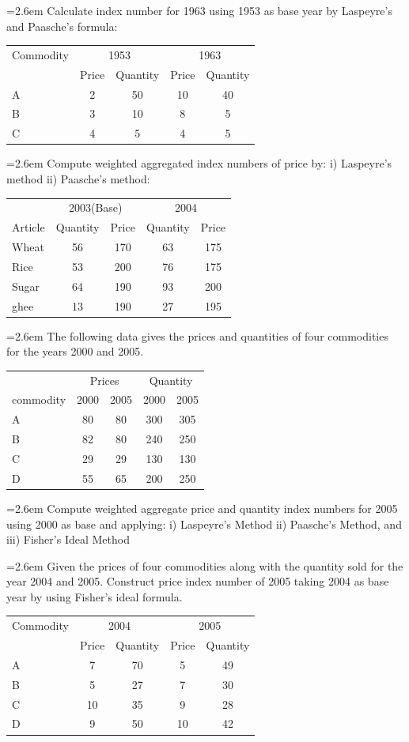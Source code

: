 \documentclass[11pt,a4paper]{article}
\newcommand{\Q}[2]{\par\smallskip\noindent\hangindent=2.6em\hangafter=1
  \makebox[2.6em][l]{\textbf{#1.}}#2\par}
\newcommand{\cont}[1]{\par\noindent\hangindent=2.6em\hangafter=-100 #1}
\newcommand{\dtab}[2]{\par\smallskip\noindent\hspace*{2.6em}\begin{tabular}{#1}\hline #2\\ \hline\end{tabular}\par\smallskip}
\begin{document}
\Q{104}{Calculate index number for 1963 using 1953 as base year by Laspeyre's and Paasche's formula:\dtab{|l@{\hspace{2em}}c@{\hspace{2em}}c@{\hspace{2em}}c@{\hspace{2em}}c|}{Commodity & \multicolumn{2}{c}{1953} & \multicolumn{2}{c}{1963} \\  & Price & Quantity & Price & Quantity \\ A & 2 & 50 & 10 & 40 \\ B & 3 & 10 & 8 & 5 \\ C & 4 & 5 & 4 & 5}}
\Q{105}{Compute weighted aggregated index numbers of price by: i) Laspeyre's method ii) Paasche's method:\dtab{|l@{\hspace{2em}}c@{\hspace{2em}}c@{\hspace{2em}}c@{\hspace{2em}}c|}{ & \multicolumn{2}{c}{2003(Base)} & \multicolumn{2}{c}{2004} \\ Article & Quantity & Price & Quantity & Price \\ Wheat & 56 & 170 & 63 & 175 \\ Rice & 53 & 200 & 76 & 175 \\ Sugar & 64 & 190 & 93 & 200 \\ ghee & 13 & 190 & 27 & 195}}
\Q{106}{The following data gives the prices and quantities of four commodities for the years 2000 and 2005.\dtab{|l@{\hspace{2em}}c@{\hspace{2em}}c@{\hspace{2em}}c@{\hspace{2em}}c|}{ & \multicolumn{2}{c}{Prices} & \multicolumn{2}{c}{Quantity} \\ commodity & 2000 & 2005 & 2000 & 2005 \\ A & 80 & 80 & 300 & 305 \\ B & 82 & 80 & 240 & 250 \\ C & 29 & 29 & 130 & 130 \\ D & 55 & 65 & 200 & 250}\cont{Compute weighted aggregate price and quantity index numbers for 2005 using 2000 as base and applying: i) Laspeyre's Method ii) Paasche's Method, and iii) Fisher's Ideal Method}}
\Q{107}{Given the prices of four commodities along with the quantity sold for the year 2004 and 2005. Construct price index number of 2005 taking 2004 as base year by using Fisher's ideal formula.\dtab{|l@{\hspace{2em}}c@{\hspace{2em}}c@{\hspace{2em}}c@{\hspace{2em}}c|}{Commodity & \multicolumn{2}{c}{2004} & \multicolumn{2}{c}{2005} \\  & Price & Quantity & Price & Quantity \\ A & 7 & 70 & 5 & 49 \\ B & 5 & 27 & 7 & 30 \\ C & 10 & 35 & 9 & 28 \\ D & 9 & 50 & 10 & 42}}
\end{document}

